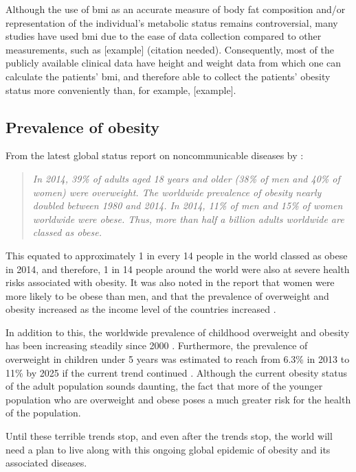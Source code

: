 Although the use of \gls{bmi} as an accurate measure of body fat composition and/or representation of the individual's metabolic status remains controversial, many studies have used \gls{bmi} due to the ease of data collection compared to other measurements, such as [example] (citation needed).
Consequently, most of the publicly available clinical data have height and weight data from which one can calculate the patients' \gls{bmi}, and therefore able to collect the patients' obesity status more conveniently than, for example, [example].

\citep{Gelber2008, Lee2008, Yusuf2005}

\subsection{Prevalence of obesity}
\label{sub:prevalence_of_obesity}

From the latest global status report on noncommunicable diseases by \citet{WHO2014}:
\begin{quote}
	\textit{
		In 2014, 39\% of adults aged 18 years and older (38\% of men and 40\% of women) were overweight.
		The worldwide prevalence of obesity nearly doubled between 1980 and 2014.
		In 2014, 11\% of men and 15\% of women worldwide were obese.
		Thus, more than half a billion adults worldwide are classed as obese.
	}
\end{quote}

\noindent
This equated to approximately 1 in every 14 people in the world classed as obese in 2014, and therefore, 1 in 14 people around the world were also at severe health risks associated with obesity.
It was also noted in the report that women were more likely to be obese than men, and that the prevalence of overweight and obesity increased as the income level of the countries increased \citep{WHO2014}.

In addition to this, the worldwide prevalence of childhood overweight and obesity has been increasing steadily since 2000 \citep{WHO2014}.
Furthermore, the prevalence of overweight in children under 5 years was estimated to reach from 6.3\% in 2013 to 11\% by 2025 if the current trend continued \citep{WHO2014}.
Although the current obesity status of the adult population sounds daunting, the fact that more of the younger population who are overweight and obese poses a much greater risk for the health of the population.

Until these terrible trends stop, and even after the trends stop, the world will need a plan to live along with this ongoing global epidemic of obesity and its associated diseases.

